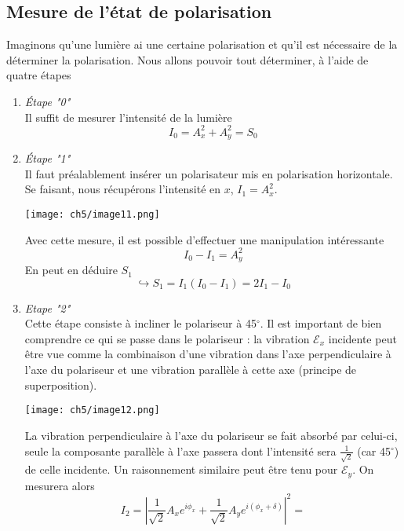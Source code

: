 	\subsection{Mesure de l'état de polarisation}
	Imaginons qu'une lumière ai une certaine polarisation et qu'il est nécessaire de la déterminer 
	la polarisation. Nous allons pouvoir tout déterminer, à l'aide de quatre étapes 
	\begin{enumerate}
	\item \textit{Étape "0"}\\
	Il suffit de mesurer l'intensité de la lumière
	\begin{equation}
	I_0 = A_x^2+A_y^2 = S_0
	\end{equation}
	\item \textit{Étape "1"}\\
	Il faut préalablement insérer un polarisateur mis en polarisation horizontale. Se faisant, 
	nous récupérons l'intensité en $x$, $I_1=A_x^2$. 
	\begin{center}
	\texttt{[image: ch5/image11.png]}
	\end{center}	
	Avec cette mesure, il est possible d'effectuer 
	une manipulation intéressante
	\begin{equation}
	I_0-I_1 = A_y^2
	\end{equation}
	En peut en déduire $S_1$
	\begin{equation}
	\hookrightarrow S_1 = I_1(I_0-I_1) = 2I_1-I_0
	\end{equation}
	\item \textit{Etape "2"}\\
	Cette étape consiste à incliner le polariseur à 45$^\circ$. Il est important de bien comprendre 
	ce qui se passe dans le polariseur : la vibration $\mathcal{E}_x$ incidente peut être vue comme 
	la combinaison d'une vibration dans l'axe perpendiculaire à l'axe du polariseur  et une vibration 
	parallèle à cette axe (principe de superposition). 
	\begin{center}
	\texttt{[image: ch5/image12.png]}
	\end{center}		
	La vibration perpendiculaire à l'axe du polariseur 
	se fait absorbé par celui-ci, seule la composante parallèle à l'axe passera dont l'intensité sera 
	$\frac{1}{\sqrt{2}}$ (car 45$^\circ$)  de celle incidente. Un raisonnement similaire peut être tenu 
	pour $\mathcal{E}_y$. On mesurera alors
	\begin{equation}
	I_2 = \left|\dfrac{1}{\sqrt{2}}A_xe^{i\phi_x}+\dfrac{1}{\sqrt{2}}A_ye^{i(\phi_x+\delta)}\right|^2 = 

\end{equation}
\end{enumerate}
